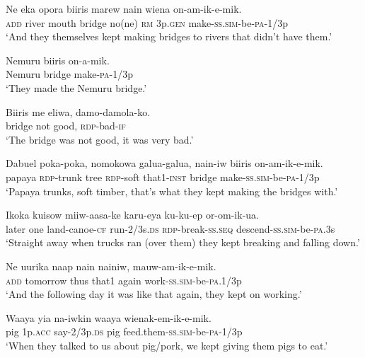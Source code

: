 \ea\label{ex:a:x48}
\gll  Ne  eka  opora  biiris  marew  nain  wiena  on-am-ik-e-mik. \\
\textsc{add}  river  mouth  bridge  no(ne)  \textsc{rm}  3p.\textsc{gen} make-\textsc{ss}.\textsc{sim}-be-\textsc{pa}-1/3p \\ 
\glt ‘And they themselves kept making bridges to rivers that didn’t have them.’ \\
\z


\ea\label{ex:a:x49}
\gll  Nemuru  biiris  on-a-mik. \\
Nemuru  bridge  make-\textsc{pa}-1/3p \\
\glt ‘They made the Nemuru bridge.’ \\
\z


\ea\label{ex:a:x50}
\gll  Biiris  me  eliwa,  damo-damola-ko. \\
bridge  not  good,  \textsc{rdp}-bad-\textsc{if} \\
\glt ‘The bridge was not good, it was very bad.’ \\
\z


\ea\label{ex:a:x51}
\gll  Dabuel  poka-poka,  nomokowa  galua-galua,  nain-iw  biiris  on-am-ik-e-mik. \\
papaya  \textsc{rdp}-trunk  tree  \textsc{rdp}-soft that1-\textsc{inst}  bridge  make-\textsc{ss}.\textsc{sim}-be-\textsc{pa}-1/3p\\ 
\glt ‘Papaya trunks, soft timber, that’s what they kept making the bridges with.’ \\
\z


\ea\label{ex:a:x52}
\gll  Ikoka  kuisow  miiw-aasa-ke  karu-eya  ku-ku-ep   or-om-ik-ua. \\
later  one  land-canoe-\textsc{cf}  run-2/3s.\textsc{ds}  \textsc{rdp}-break-\textsc{ss.seq} descend-\textsc{ss}.\textsc{sim}-be-\textsc{pa}.3s \\ 
\glt ‘Straight away when trucks ran (over them) they kept breaking and falling down.’ \\
\z


\ea\label{ex:a:x53}
\gll  Ne  uurika  naap  nain  nainiw,  mauw-am-ik-e-mik. \\
\textsc{add}  tomorrow  thus  that1  again  work-\textsc{ss}.\textsc{sim}-be-\textsc{pa}.1/3p \\
\glt ‘And the following day it was like that again, they kept on working.’ \\
\z


\ea\label{ex:a:x54}
\gll  Waaya  yia  na-iwkin  waaya  wienak-em-ik-e-mik. \\
pig  1p.\textsc{acc}  say-2/3p.\textsc{ds}  pig  feed.them{}-\textsc{ss}.\textsc{sim}-be-\textsc{pa}-1/3p \\
\glt ‘When they talked to us about pig/pork, we kept giving them pigs to eat.’ \\
\z



